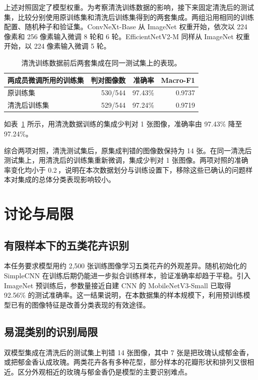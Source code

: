 \documentclass[11pt,a4paper,UTF8,fontset=windows]{ctexart}
\newcommand{\pp}{\,\text{pp}}
\begin{document}
上述对照固定了模型权重。为考察清洗训练数据的影响，接下来固定清洗后的测试集，比较分别使用原训练集和清洗后训练集得到的两套集成。两组沿用相同的训练配置、随机种子和验证集。ConvNeXt-Base 从 ImageNet 权重开始，依次以 224 像素和 256 像素输入微调 8 轮和 6 轮。EfficientNetV2-M 同样从 ImageNet 权重开始，以 224 像素输入微调 5 轮。

\begin{table}[H]
\centering
\small
\caption{清洗训练数据前后两套集成在同一测试集上的表现。}
\label{tab:clean-pair-control}
\begin{tabular}{lrrr}
\toprule
两成员微调所用的训练集 & 判对图像数 & 准确率 & Macro-F1 \\
\midrule
原训练集 & 530/544 & 97.43\% & 0.9737 \\
清洗后训练集 & 529/544 & 97.24\% & 0.9719 \\
\bottomrule
\end{tabular}
\end{table}

如表~\ref{tab:clean-pair-control} 所示，用清洗数据训练的集成少判对 1 张图像，准确率由 97.43\% 降至 97.24\%。

综合两项对照，清洗测试集后，原集成判错的图像数保持为 14 张。在同一清洗后测试集上，用清洗后的训练集重新微调，集成少判对 1 张图像。两项对照的准确率变化均小于 0.2\pp，说明在本次数据划分与训练设置下，移除这些已确认的问题样本对集成的总体分类表现影响较小。

\section{讨论与局限}
\label{sec:discussion}

\subsection{有限样本下的五类花卉识别}

本任务要求模型用约 2{,}500 张训练图像学习五类花卉的外观差异。随机初始化的 SimpleCNN 在训练后期仍能进一步拟合训练样本，验证准确率却趋于平稳。引入 ImageNet 预训练后，参数量接近自建 CNN 的 MobileNetV3-Small 已取得 92.56\% 的测试准确率。这一结果说明，在本数据集的样本规模下，利用预训练模型已有的图像特征是改善分类表现的有效途径。

\subsection{易混类别的识别局限}

双模型集成在清洗后的测试集上判错 14 张图像，其中 7 张是把玫瑰认成郁金香，或把郁金香认成玫瑰。两类花卉各有多种花型，部分样本的花瓣形状和排列又很相近。区分外观相近的玫瑰与郁金香仍是模型的主要识别难点。
\end{document}
